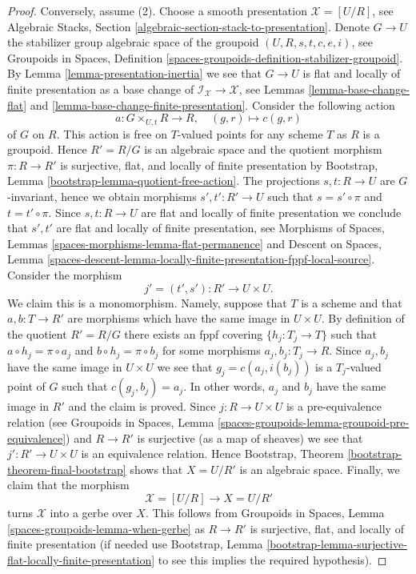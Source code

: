 \begin{proof}
\medskip\noindent
Conversely, assume (2). Choose a smooth presentation $\mathcal{X} = [U/R]$, see
Algebraic Stacks, Section \ref{algebraic-section-stack-to-presentation}.
Denote $G \to U$ the stabilizer group algebraic space of the groupoid
$(U, R, s, t, c, e, i)$, see
Groupoids in Spaces, Definition
\ref{spaces-groupoids-definition-stabilizer-groupoid}.
By
Lemma \ref{lemma-presentation-inertia}
we see that $G \to U$ is flat and locally of finite presentation as
a base change of $\mathcal{I}_\mathcal{X} \to \mathcal{X}$, see
Lemmas \ref{lemma-base-change-flat} and
\ref{lemma-base-change-finite-presentation}.
Consider the following action
$$
a : G \times_{U, t} R \to R, \quad (g, r) \mapsto c(g, r)
$$
of $G$ on $R$. This action is free on $T$-valued points for any
scheme $T$ as $R$ is a groupoid. Hence $R' = R/G$ is an algebraic
space and the quotient morphism $\pi : R \to R'$ is surjective,
flat, and locally of finite presentation by
Bootstrap, Lemma \ref{bootstrap-lemma-quotient-free-action}.
The projections $s, t : R \to U$ are $G$-invariant, hence
we obtain morphisms $s' , t' : R' \to U$ such that $s = s' \circ \pi$
and $t = t' \circ \pi$.
Since $s, t : R \to U$ are flat and locally of finite presentation
we conclude that $s', t'$ are flat and locally of finite presentation, see
Morphisms of Spaces, Lemmas
\ref{spaces-morphisms-lemma-flat-permanence} and
Descent on Spaces, Lemma
\ref{spaces-descent-lemma-locally-finite-presentation-fppf-local-source}.
Consider the morphism
$$
j' = (t', s') : R' \longrightarrow U \times U.
$$
We claim this is a monomorphism. Namely, suppose that $T$ is a scheme
and that $a, b : T \to R'$ are morphisms which have the same image
in $U \times U$. By definition of the quotient $R' = R/G$ there
exists an fppf covering $\{h_j : T_j \to T\}$ such
that $a \circ h_j = \pi \circ a_j$ and $b \circ h_j = \pi \circ b_j$
for some morphisms $a_j, b_j : T_j \to R$. Since $a_j, b_j$ have the same
image in $U \times U$ we see that $g_j = c(a_j, i(b_j))$ is a $T_j$-valued
point of $G$ such that $c(g_j, b_j) = a_j$. In other words, $a_j$ and
$b_j$ have the same image in $R'$ and the claim is proved.
Since $j : R \to U \times U$ is a pre-equivalence relation (see
Groupoids in Spaces, Lemma
\ref{spaces-groupoids-lemma-groupoid-pre-equivalence})
and $R \to R'$ is surjective (as a map of sheaves) we see that
$j' : R' \to U \times U$ is an equivalence relation.
Hence
Bootstrap, Theorem \ref{bootstrap-theorem-final-bootstrap}
shows that $X = U/R'$ is an algebraic space.
Finally, we claim that the morphism
$$
\mathcal{X} = [U/R] \longrightarrow X = U/R'
$$
turns $\mathcal{X}$ into a gerbe over $X$. This follows from
Groupoids in Spaces, Lemma \ref{spaces-groupoids-lemma-when-gerbe}
as $R \to R'$ is surjective, flat, and locally of finite presentation
(if needed use
Bootstrap, Lemma
\ref{bootstrap-lemma-surjective-flat-locally-finite-presentation}
to see this implies the required hypothesis).
\end{proof}

